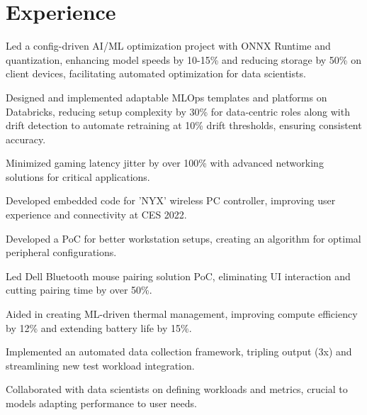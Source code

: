 \documentclass[]{resume-openfont}
\begin{document}
    \begin{minipage}[t]{1\textwidth}
        \section{Experience}
        \sectiontitlerule

        \vspace{3mm}
        \begin{tightemize}
            \item Led a config-driven AI/ML optimization project with ONNX Runtime and quantization, enhancing model speeds by 10-15\% and reducing storage by 50\% on client devices, facilitating automated optimization for data scientists.
            \item Designed and implemented adaptable MLOps templates and platforms on Databricks, reducing setup complexity by 30\% for data-centric roles along with drift detection to automate retraining at 10\% drift thresholds, ensuring consistent accuracy.
            \item Minimized gaming latency jitter by over 100\% with advanced networking solutions for critical applications.
            \item Developed embedded code for 'NYX' wireless PC controller, improving user experience and connectivity at CES 2022.
            \item Developed a PoC for better workstation setups, creating an algorithm for optimal peripheral configurations.
        \end{tightemize}
        \begin{tightemize}
            \item Led Dell Bluetooth mouse pairing solution PoC, eliminating UI interaction and cutting pairing time by over 50\%.
            \item Aided in creating ML-driven thermal management, improving compute efficiency by 12\% and extending battery life by 15\%.
            \item Implemented an automated data collection framework, tripling output (3x) and streamlining new test workload integration.
            \item Collaborated with data scientists on defining workloads and metrics, crucial to models adapting performance to user needs.
        \end{tightemize}


\end{minipage}
\end{document}
